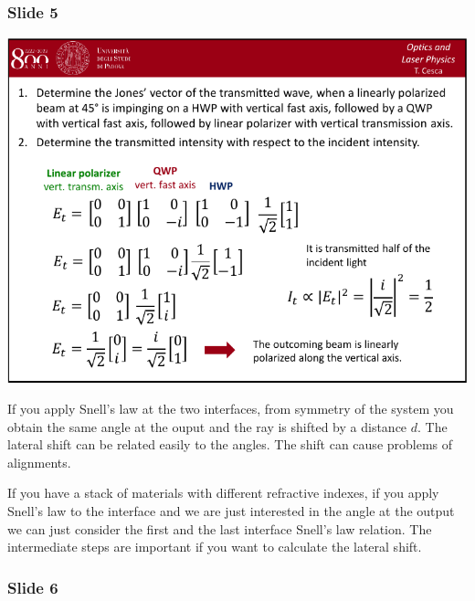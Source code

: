 \documentclass[../main/main.tex]{subfiles}
\begin{document}
\subsubsection*{Slide 5}

\begin{minipage}[]{0.5\linewidth}
\centering
\includegraphics[page=5,width=1\textwidth]{../lessons/pdf_file/04_lecture.pdf}
\end{minipage}
\hspace{0.3cm}\vspace{0.3cm}
\begin{minipage}[c]{0.47\linewidth}

If you apply Snell's law at the two interfaces, from symmetry of the system you obtain the same angle at the ouput and the ray is shifted by a distance \( d \). The lateral shift can be related easily to the angles.
The shift can cause problems of alignments.

If you have a stack of materials with different refractive indexes, if you apply Snell's law to the interface and we are just interested in the angle at the output we can just consider the first and the last interface Snell's law relation. The intermediate steps are important if you want to calculate the lateral shift.

\end{minipage}

\subsubsection*{Slide 6}
\end{document}
